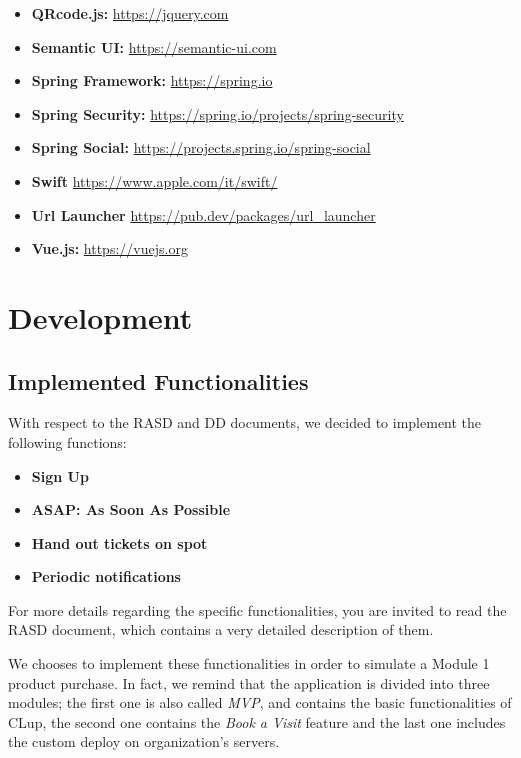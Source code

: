 \documentclass[table, 12pt]{article}
\begin{document}
\begin{itemize}
    \item \textbf{QRcode.js: } \href{https://jquery.com}{https://jquery.com}
    \item \textbf{Semantic UI: } \href{https://semantic-ui.com}{https://semantic-ui.com}
    \item \textbf{Spring Framework: } \href{https://spring.io}{https://spring.io}
    \item \textbf{Spring Security: } \href{https://spring.io/projects/spring-security}{https://spring.io/projects/spring-security}
    \item \textbf{Spring Social: } \href{https://projects.spring.io/spring-social}{https://projects.spring.io/spring-social}
    \item \textbf{Swift} \href{https://www.apple.com/it/swift/}{https://www.apple.com/it/swift/}
    \item \textbf{Url Launcher} \href{https://pub.dev/packages/url_launcher}{https://pub.dev/packages/url\_launcher}
    \item \textbf{Vue.js: } \href{https://vuejs.org}{https://vuejs.org}
\end{itemize}

\newpage
\section{Development}
\subsection{Implemented Functionalities}
With respect to the RASD and DD documents, we decided to implement the following functions:
\begin{itemize}
    \item \textbf{Sign Up}
    \item \textbf{ASAP: As Soon As Possible}
    \item \textbf{Hand out tickets on spot}
    \item \textbf{Periodic notifications}
\end{itemize}
For more details regarding the specific functionalities, you are invited to read the RASD document, which contains a very detailed description of them.

We chooses to implement these functionalities in order to simulate a Module 1 product purchase. In fact, we remind that the application is divided into three modules; the first one is also called \textit{MVP}, and contains the basic functionalities of CLup, the second one contains the \textit{Book a Visit} feature and the last one includes the custom deploy on organization's servers.
\end{document}
